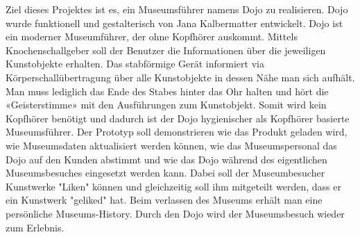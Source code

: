 Ziel dieses Projektes ist es, ein Museumsführer namens Dojo zu realisieren. Dojo wurde funktionell und gestalterisch von Jana Kalbermatter entwickelt. Dojo ist ein moderner Museumführer, der ohne Kopfhörer auskommt. Mittels Knochenschallgeber soll der Benutzer die Informationen über die jeweiligen Kunstobjekte erhalten. Das stabförmige Gerät informiert via Körperschallübertragung über alle Kunstobjekte in dessen Nähe man sich aufhält. Man muss lediglich das Ende des Stabes hinter das Ohr halten und hört die «Geisterstimme» mit den Ausführungen zum Kunstobjekt. Somit wird kein Kopfhörer benötigt und dadurch ist der Dojo hygienischer als Kopfhörer basierte Museumsführer.
Der Prototyp soll demonstrieren wie das Produkt geladen wird, wie Museumsdaten aktualisiert werden können, wie das Museumspersonal das Dojo auf den Kunden abstimmt und wie das Dojo während des eigentlichen Museumsbesuches eingesetzt werden kann. Dabei soll der Museumbesucher Kunstwerke "Liken" können und gleichzeitig soll ihm mitgeteilt werden, dass er ein Kunstwerk "geliked" hat.
Beim verlassen des Museums erhält man eine persönliche Museums-History. Durch den Dojo wird der Museumsbesuch wieder zum Erlebnis.